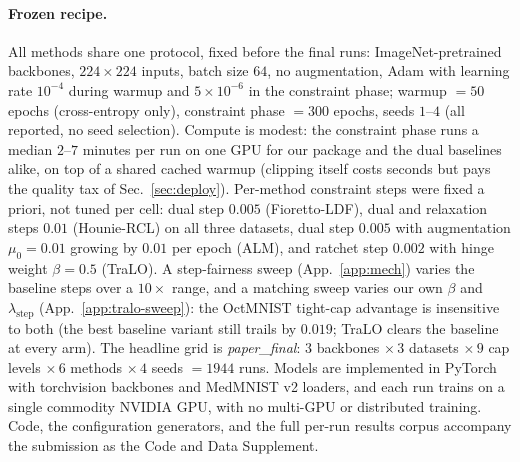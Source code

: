 \documentclass[10pt]{article}
\begin{document}
\paragraph{Frozen recipe.}
All methods share one protocol, fixed before the final runs:
ImageNet-pretrained backbones, $224{\times}224$ inputs, batch size $64$, no
augmentation, Adam with learning rate $10^{-4}$ during warmup and
$5{\times}10^{-6}$ in the constraint phase; warmup $=50$ epochs
(cross-entropy only), constraint phase $=300$ epochs, seeds $1$--$4$ (all
reported, no seed selection). Compute is modest: the constraint phase runs
a median $2$--$7$ minutes per run on one GPU for our package and the dual
baselines alike, on top of a shared cached warmup (clipping itself costs
seconds but pays the quality tax of Sec.~\ref{sec:deploy}). Per-method
constraint steps were fixed a priori, not tuned per cell: dual step $0.005$
(Fioretto-LDF), dual and relaxation steps $0.01$ (Hounie-RCL) on all three
datasets,{\color{blue} dual step $0.005$ with augmentation $\mu_0{=}0.01$ growing
by $0.01$ per epoch (ALM),} and ratchet step $0.002$ with hinge weight
$\beta{=}0.5$ (TraLO).
A step-fairness sweep (App.~\ref{app:mech}) varies the baseline steps
over a $10\times$ range, and a matching sweep varies our own $\beta$ and
$\lambda_{\text{step}}$ (App.~\ref{app:tralo-sweep}): the OctMNIST
tight-cap advantage is insensitive to both (the best baseline variant still
trails by $0.019$; TraLO clears the baseline at every arm). The headline
grid is \emph{paper\_final}: $3$ backbones $\times\,3$ datasets $\times\,9$
cap levels $\times\,6$ methods $\times\,4$ seeds $=1944$ runs. Models are
implemented in PyTorch with torchvision backbones and MedMNIST v2 loaders,
and each run trains on a single commodity NVIDIA GPU, with no multi-GPU or
distributed training. Code, the configuration generators, and the full
per-run results corpus accompany the submission as the Code and Data
Supplement.
\end{document}
